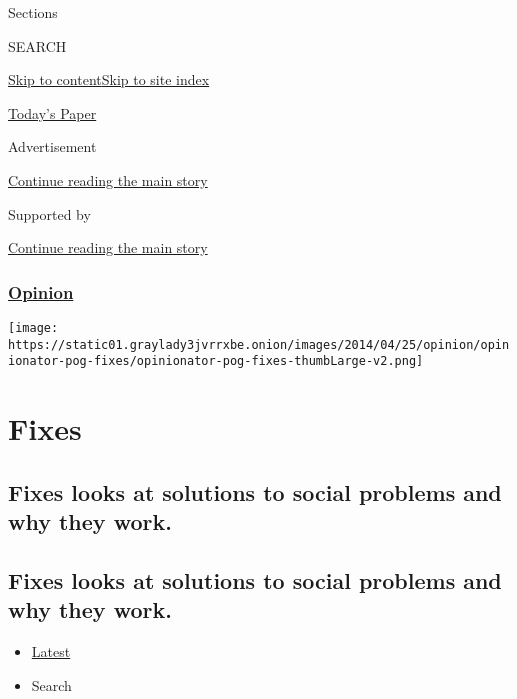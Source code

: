 Sections

SEARCH

\protect\hyperlink{site-content}{Skip to
content}\protect\hyperlink{site-index}{Skip to site index}

\href{https://myaccount.nytimes3xbfgragh.onion/auth/login?response_type=cookie\&client_id=vi}{}

\href{https://www.nytimes3xbfgragh.onion/section/todayspaper}{Today's
Paper}

Advertisement

\protect\hyperlink{after-top}{Continue reading the main story}

Supported by

\protect\hyperlink{after-sponsor}{Continue reading the main story}

\hypertarget{opinion}{%
\subsubsection{\texorpdfstring{\href{/section/opinion}{Opinion}}{Opinion}}\label{opinion}}

\texttt{[image: https://static01.graylady3jvrrxbe.onion/images/2014/04/25/opinion/opinionator-pog-fixes/opinionator-pog-fixes-thumbLarge-v2.png]}

\hypertarget{fixes}{%
\section{Fixes}\label{fixes}}

\hypertarget{fixes-looks-at-solutions-to-social-problems-and-why-they-work}{%
\subsection{Fixes looks at solutions to social problems and why they
work.}\label{fixes-looks-at-solutions-to-social-problems-and-why-they-work}}

\hypertarget{fixes-looks-at-solutions-to-social-problems-and-why-they-work-1}{%
\subsection{Fixes looks at solutions to social problems and why they
work.}\label{fixes-looks-at-solutions-to-social-problems-and-why-they-work-1}}

\begin{itemize}
\tightlist
\item
  \protect\hyperlink{stream-panel}{Latest}
\item
  Search
\end{itemize}


